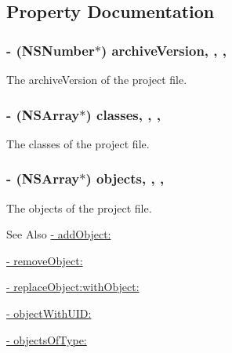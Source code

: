 \subsection{Property Documentation}
\hypertarget{interface_f_f_x_c_project_file_a818588557d0a69a9fdf8841226927ede}{
\subsubsection[{archive\-Version}]{\setlength{\rightskip}{0pt plus 5cm}-\/ (N\-S\-Number$\ast$) archive\-Version\hspace{0.3cm}{\ttfamily [read]}, {\ttfamily [write]}, {\ttfamily [nonatomic]}, {\ttfamily [strong]}}}\label{interface_f_f_x_c_project_file_a818588557d0a69a9fdf8841226927ede}
The archive\-Version of the project file. \hypertarget{interface_f_f_x_c_project_file_a96ddee82bd96e6aedcabb1b5525d271a}{
\subsubsection[{classes}]{\setlength{\rightskip}{0pt plus 5cm}-\/ (N\-S\-Array$\ast$) classes\hspace{0.3cm}{\ttfamily [read]}, {\ttfamily [write]}, {\ttfamily [nonatomic]}, {\ttfamily [strong]}}}\label{interface_f_f_x_c_project_file_a96ddee82bd96e6aedcabb1b5525d271a}
The classes of the project file. \hypertarget{interface_f_f_x_c_project_file_a33fea1547ee2353ca544f62044b2f27a}{
\subsubsection[{objects}]{\setlength{\rightskip}{0pt plus 5cm}-\/ (N\-S\-Array$\ast$) objects\hspace{0.3cm}{\ttfamily [read]}, {\ttfamily [write]}, {\ttfamily [nonatomic]}, {\ttfamily [strong]}}}\label{interface_f_f_x_c_project_file_a33fea1547ee2353ca544f62044b2f27a}
The objects of the project file. \begin{DoxySeeAlso}{See Also}
\hyperlink{interface_f_f_x_c_project_file_a40c393723bfc2ad74378e19af034b18c}{-\/ add\-Object\-:} 

\hyperlink{interface_f_f_x_c_project_file_a1402332506ddd01bcb9fbfa0fab484f4}{-\/ remove\-Object\-:} 

\hyperlink{interface_f_f_x_c_project_file_a14e5b126a4f713f29c4c1449d4c63e01}{-\/ replace\-Object\-:with\-Object\-:} 

\hyperlink{interface_f_f_x_c_project_file_aec605cfbd30920d1b829cb1a5f645441}{-\/ object\-With\-U\-I\-D\-:} 

\hyperlink{interface_f_f_x_c_project_file_af770163bd6a175c385efbfac3e5595e8}{-\/ objects\-Of\-Type\-:} 
\end{DoxySeeAlso}

